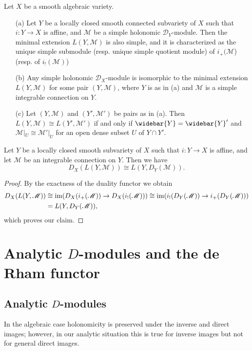 \begin{theorem}\label{D-module holonomic simple module char by minimal extension}
Let $X$ be a smooth algebraic variety.
\begin{enumerate}
    \item[(a)] Let $Y$ be a locally closed smooth connected subvariety of $X$ such that $i:Y\to X$ is affine, and $\mathscr{M}$ be a simple holonomic $\mathscr{D}_Y$-module. Then the minimal extension $L(Y,\mathscr{M})$ is also simple, and it is characterized as the unique simple submodule (resp. unique simple quotient module) of $i_+(\mathscr{M}$) (resp. of $i_!(\mathscr{M})$)
    \item[(b)] Any simple holonomic $\mathscr{D}_X$-module is isomorphic to the minimal extension $L(Y,\mathscr{M})$ for some pair $(Y,\mathscr{M})$, where $Y$ is as in (a) and $\mathscr{M}$ is a simple integrable connection on $Y$.
    \item[(c)] Let $(Y,\mathscr{M})$ and $(Y',\mathscr{M}')$ be pairs as in (a). Then $L(Y,\mathscr{M})\cong L(Y',\mathscr{M}')$ if and only if $\widebar{Y}=\widebar{Y}'$ and $\mathscr{M}|_U\cong\mathscr{M}'|_{U}$ for an open dense subset $U$ of $Y\cap Y'$.
\end{enumerate}
\end{theorem}

\begin{proposition}\label{D-module holonomic minimal extension commutes with dual}
Let $Y$ be a locally closed smooth subvariety of $X$ such that $i:Y\to X$ is affine, and let $\mathscr{M}$ be an integrable connection on $Y$. Then we have
\[D_X(L(Y,\mathscr{M}))\cong L(Y,D_Y(\mathscr{M})).\]
\end{proposition}
\begin{proof}
By the exactness of the duality functor we obtain
\begin{align*}
D_X(L(Y,\mathscr{M}))&\cong\operatorname{im}(D_X(i_+(\mathscr{M}))\to D_X(i_!(\mathscr{M})))\cong\operatorname{im}(i_!(D_Y(\mathscr{M}))\to i_+(D_Y(\mathscr{M})))\\
&=L(Y,D_Y(\mathscr{M})),
\end{align*}
which proves our claim.
\end{proof}

\section{Analytic \texorpdfstring{$D$}{D}-modules and the de Rham functor}
\subsection{Analytic \texorpdfstring{$D$}{D}-modules}
In the algebraic case holonomicity is preserved under the inverse and direct images; however, in our analytic situation this is true for inverse images but not for general direct images.

